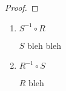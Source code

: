 
\begin{theorem}
\end{theorem}

\begin{proof}
\end{proof}

\begin{enumerate}[label=\alph*]
  \item $S^{-1} \circ R$

    $S$ bleh bleh

  \item $R^{-1} \circ S$

    $R$ bleh
\end{enumerate}
